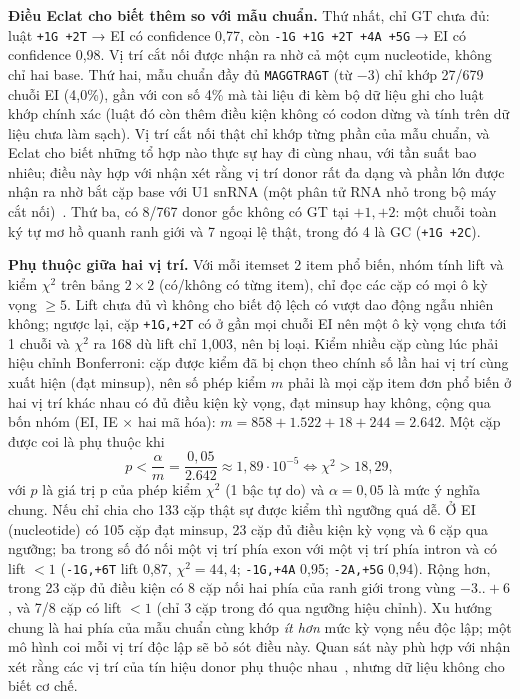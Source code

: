 \textbf{Điều Eclat cho biết thêm so với mẫu chuẩn.} Thứ nhất, chỉ GT chưa đủ: luật \texttt{+1G +2T} → EI có
confidence 0,77, còn \texttt{-1G +1G +2T +4A +5G} → EI có confidence 0,98. Vị trí cắt nối được nhận ra nhờ cả
một cụm nucleotide, không chỉ hai base. Thứ hai, mẫu chuẩn đầy đủ \texttt{MAGGTRAGT} (từ $-3$) chỉ khớp 27/679
chuỗi EI (4,0\%), gần với con số 4\% mà tài liệu đi kèm bộ dữ liệu ghi cho luật khớp chính xác (luật đó còn
thêm điều kiện không có codon dừng và tính trên dữ liệu chưa làm sạch). Vị trí cắt nối
thật chỉ khớp từng phần của mẫu chuẩn, và Eclat cho biết những tổ hợp nào thực sự hay đi cùng nhau, với tần suất
bao nhiêu; điều này hợp với nhận xét rằng vị trí donor rất đa dạng và phần lớn được nhận ra nhờ bắt cặp base với
U1 snRNA (một phân tử RNA nhỏ trong bộ máy cắt nối)~\cite{roca2013pick}. Thứ ba, có 8/767 donor gốc không có GT tại $+1,+2$: một chuỗi toàn ký tự mơ hồ quanh
ranh giới và 7 ngoại lệ thật, trong đó 4 là GC (\texttt{+1G +2C}).

\textbf{Phụ thuộc giữa hai vị trí.} Với mỗi itemset 2 item phổ biến, nhóm tính lift và kiểm $\chi^2$ trên bảng
$2 \times 2$ (có/không có từng item), chỉ đọc các cặp có mọi ô kỳ vọng $\ge 5$. Lift chưa đủ vì không cho biết
độ lệch có vượt dao động ngẫu nhiên không; ngược lại, cặp \texttt{+1G,+2T} có ở gần mọi chuỗi EI nên một ô kỳ
vọng chưa tới 1 chuỗi và $\chi^2$ ra 168 dù lift chỉ 1,003, nên bị loại. Kiểm nhiều cặp cùng lúc phải hiệu chỉnh
Bonferroni: cặp được kiểm đã bị chọn theo chính số lần hai vị trí cùng xuất hiện (đạt minsup), nên số phép kiểm
$m$ phải là mọi cặp item đơn phổ biến ở hai vị trí khác nhau có đủ điều kiện kỳ vọng, đạt minsup hay không,
cộng qua bốn nhóm (EI, IE × hai mã hóa): $m = 858 + 1.522 + 18 + 244 = 2.642$. Một cặp được coi là phụ thuộc khi
\begin{equation}
p < \frac{\alpha}{m} = \frac{0{,}05}{2.642} \approx 1{,}89 \cdot 10^{-5}
\iff \chi^2 > 18{,}29,
\label{eq:bonferroni}
\end{equation}
với $p$ là giá trị p của phép kiểm $\chi^2$ (1 bậc tự do) và $\alpha = 0{,}05$ là mức ý nghĩa chung. Nếu chỉ chia
cho 133 cặp thật sự được kiểm thì ngưỡng quá dễ. Ở EI (nucleotide) có 105 cặp đạt minsup, 23 cặp đủ điều kiện kỳ vọng và 6 cặp qua ngưỡng;
ba trong số đó nối một vị trí phía exon với một vị trí phía intron và có lift $< 1$ (\texttt{-1G,+6T} lift 0,87,
$\chi^2 = 44{,}4$; \texttt{-1G,+4A} 0,95; \texttt{-2A,+5G} 0,94). Rộng hơn, trong 23 cặp đủ điều kiện có 8 cặp nối
hai phía của ranh giới trong vùng $-3..+6$, và 7/8 cặp có lift $< 1$ (chỉ 3 cặp trong đó qua ngưỡng hiệu chỉnh). Xu hướng chung là hai phía của mẫu chuẩn cùng khớp
\emph{ít hơn} mức kỳ vọng nếu độc lập; một mô hình coi mỗi vị trí độc lập sẽ bỏ sót điều này. Quan sát này phù
hợp với nhận xét rằng các vị trí của tín hiệu donor phụ thuộc nhau~\cite{burge1997prediction}, nhưng dữ liệu
không cho biết cơ chế.

